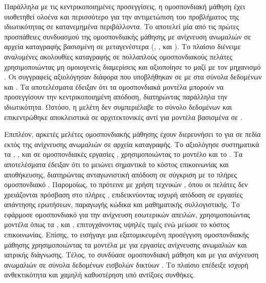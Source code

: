 Παράλληλα με τις κεντρικοποιημένες προσεγγίσεις, η ομοσπονδιακή μάθηση έχει υιοθετηθεί ολοένα και περισσότερο για την αντιμετώπιση του προβλήματος της ιδιωτικότητας σε κατανεμημένα περιβάλλοντα. Το  \cite{ocansey2025dpflogtinyllm} αποτελεί μία από τις πρώτες προσπάθειες συνδυασμού της ομοσπονδιακής μάθησης με ανίχνευση ανωμαλιών σε αρχεία καταγραφής βασισμένη σε μεταγενέστερα  (, ,  και ). Το πλαίσιο διένειμε αναλυμένες ακολουθίες καταγραφής σε πολλαπλούς ομοσπονδιακούς πελάτες χρησιμοποιώντας μη ομοιογενείς διαμερίσεις και αξιοποίησε το  μαζί με τον μηχανισμό . Οι συγγραφείς αξιολόγησαν διάφορα  που υποβλήθηκαν σε  με  στα σύνολα δεδομένων  και . Τα αποτελέσματα έδειξαν ότι τα ομοσπονδιακά μοντέλα μπορούν να προσεγγίσουν την κεντρικοποιημένη απόδοση, διατηρώντας παράλληλα την ιδιωτικότητα. Ωστόσο, η μελέτη δεν συμπεριέλαβε το σύνολο δεδομένων  και επικεντρώθηκε αποκλειστικά σε αρχιτεκτονικές  αντί για μοντέλα βασισμένα σε .

Επιπλέον, αρκετές μελέτες ομοσπονδιακής μάθησης έχουν διερευνήσει το  για  σε πεδία εκτός της ανίχνευσης ανωμαλιών σε αρχεία καταγραφής. Το  \cite{zhang2023fedpetuning} αξιολόγησε συστηματικά τα , ,  και  σε ομοσπονδιακές εργασίες , χρησιμοποιώντας το μοντέλο  και το . Τα αποτελέσματα έδειξαν ότι το  μειώνει σημαντικά το κόστος επικοινωνίας και αποθήκευσης, διατηρώντας ανταγωνιστική απόδοση σε σύγκριση με το πλήρες ομοσπονδιακό . Παρομοίως, το  \cite{fedbiot} πρότεινε  με χρήση τεχνικών , όπου οι πελάτες δεν χρειάζονται πρόσβαση στο πλήρες , επιδεικνύοντας ισχυρή απόδοση σε εργασίες απάντησης ερωτήσεων, παραγωγής κώδικα και μαθηματικής συλλογιστικής. Το  \cite{feditd} εφάρμοσε ομοσπονδιακό  για την ανίχνευση εσωτερικών απειλών, χρησιμοποιώντας μοντέλα  όπως τα ,  και , επιτυγχάνοντας υψηλές τιμές  ενώ μείωσε το κόστος επικοινωνίας. Επίσης, το  \cite{qi2024fdlora} εισήγαγε μια εξατομικευμένη προσέγγιση ομοσπονδιακής μάθησης χρησιμοποιώντας τα μοντέλα  με  για εργασίες ανίχνευσης ανωμαλιών και ιατρικής διάγνωσης. Τέλος, το  \cite{REZAEI2025111473} συνδύασε ομοσπονδιακή μάθηση και  με  για ανίχνευση ανωμαλιών σε σύνολα δεδομένων εισβολών δικτύων . Το πλαίσιο επέδειξε ισχυρή ανθεκτικότητα και χαμηλή καθυστέρηση υπό αντίξοες συνθήκες.

